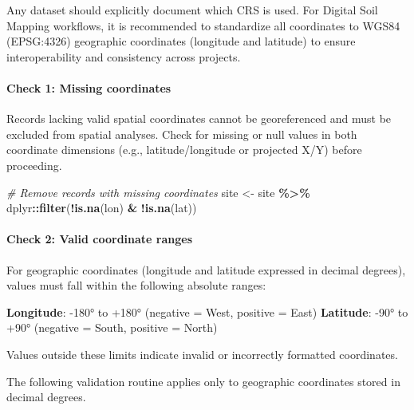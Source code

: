 \documentclass[
  10pt,
  b5paper,
  oneside]{book}
\newenvironment{Shaded}{\begin{snugshade}}{\end{snugshade}}
\newcommand{\CommentTok}[1]{\textcolor[rgb]{0.56,0.35,0.01}{\textit{#1}}}
\newcommand{\FunctionTok}[1]{\textcolor[rgb]{0.13,0.29,0.53}{\textbf{#1}}}
\newcommand{\NormalTok}[1]{#1}
\newcommand{\OtherTok}[1]{\textcolor[rgb]{0.56,0.35,0.01}{#1}}
\newcommand{\SpecialCharTok}[1]{\textcolor[rgb]{0.81,0.36,0.00}{\textbf{#1}}}
\begin{document}
Any dataset should explicitly document which CRS is used. For Digital Soil Mapping workflows, it is recommended to standardize all coordinates to WGS84 (EPSG:4326) geographic coordinates (longitude and latitude) to ensure interoperability and consistency across projects.

\paragraph*{Check 1: Missing coordinates}\label{check-1-missing-coordinates}

Records lacking valid spatial coordinates cannot be georeferenced and must be excluded from spatial analyses. Check for missing or null values in both coordinate dimensions (e.g., latitude/longitude or projected X/Y) before proceeding.

\begin{Shaded}
\begin{Highlighting}[]
  \CommentTok{\# Remove records with missing coordinates}
\NormalTok{  site }\OtherTok{\textless{}{-}}\NormalTok{ site }\SpecialCharTok{\%\textgreater{}\%}
\NormalTok{    dplyr}\SpecialCharTok{::}\FunctionTok{filter}\NormalTok{(}\SpecialCharTok{!}\FunctionTok{is.na}\NormalTok{(lon) }\SpecialCharTok{\&} \SpecialCharTok{!}\FunctionTok{is.na}\NormalTok{(lat))}
\end{Highlighting}
\end{Shaded}

\paragraph*{Check 2: Valid coordinate ranges}\label{check-2-valid-coordinate-ranges}

For geographic coordinates (longitude and latitude expressed in decimal degrees), values must fall within the following absolute ranges:

\textbf{Longitude}: -180° to +180° (negative = West, positive = East)
\textbf{Latitude}: -90° to +90° (negative = South, positive = North)

Values outside these limits indicate invalid or incorrectly formatted coordinates.

The following validation routine applies only to geographic coordinates stored in decimal degrees.
\end{document}
